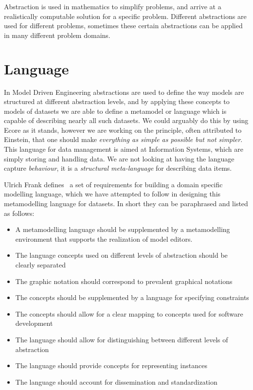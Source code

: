 \documentclass{llncs}
\begin{document}
Abstraction is used in mathematics to simplify problems, and arrive at a realistically computable solution for a specific problem. Different abstractions are used for different problems, sometimes these certain abstractions can be applied in many different problem domains. 



\section{Language}

In Model Driven Engineering abstractions are used to define the way models are structured at different abstraction levels, and by applying these concepts to models of datasets we are able to define a metamodel or language which is capable of describing nearly all such datasets. We could arguably do this by using Ecore as it stands, however we are working on the principle, often attributed to Einstein, that one should make \emph{everything as simple as possible but not simpler}. This language for data management is aimed at Information Systems, which are simply storing and handling data. We are not looking at having the language capture \emph{behaviour}, it is a \emph{structural meta-language} for describing data items.

Ulrich Frank defines~\cite{Frank2013} a set of requirements for building a domain specific modelling language, which we have attempted to follow in designing this metamodelling language for datasets. In short they can be paraphrased and listed as follows:
\begin{itemize}
	\item A metamodelling language should be supplemented by a metamodelling environment that supports the realization of model editors.
	\item The language concepts used on different levels of abstraction should be clearly separated
	\item The graphic notation should correspond to prevalent graphical notations
	\item The concepts should be supplemented by a language for specifying constraints
	\item The concepts should allow for a clear mapping to concepts used for software development
	\item The language should allow for distinguishing between different levels of abstraction
	\item The language should provide concepts for representing instances
	\item The language should account for dissemination and standardization
\end{itemize}
\end{document}
